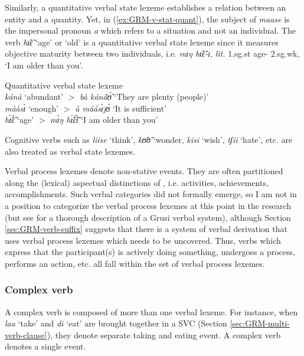 \begin{exe}
\begin{exe}
\begin{exe}
{\begin{exe}
\begin{exe}
\begin{exe}
\begin{exe}
\begin{exe}
\begin{exe}
\begin{exe}
\begin{xlist}
\begin{exe}
\begin{exe}
\begin{exe}
\begin{exe}
\begin{exe}
\begin{exe}
\begin{exe}
\begin{exe}
\begin{exe}
\begin{exe}
\begin{exe}
\begin{exe}
\begin{exe}
Similarly, a quantitative verbal state lexeme  establishes a relation between an
entity and a quantity. Yet, in (\ref{ex:GRM-v-stat-quant}), the subject of   
{\it maase} is the impersonal pronoun {\it a} which refers to a situation and 
not an
individual. The verb {\it hɪ̃ɛ̃}  `age' or `old'  is a quantitative verbal state
lexeme since it  measures  objective maturity between
two individuals, i.e. {\it mɪŋ hɪ̃ɛ̃-ɪ}, {\it lit.} {\sc 1.sg.st} age-{\sc
2.sg.wk}, `I am older than you'. 


\ea\label{ex:GRM-v-stat-quant}{\rm Quantitative verbal state lexeme}\\
 {\it kánà}  `abundant'  $>$ {\it bà kánã́ʊ̃́} `They are plenty (people)' 
\\
{\it mààsɪ̀} `enough'  $>$   {\it à máásɪ́jʊ́} `It is sufficient'\\
{\it hɪ̃̀ɛ̃̀} `age' $>$ {\it mɪ́ŋ hɪ̃́ɛ̃́ɪ̃̀} `I am older than you'
\z

Cognitive verbs such as {\it liise} `think',  {\it kʊ̃ʊ̃} `wonder, 
{\it kisi} `wish',    {\it tʃii} `hate', etc.  are also treated as verbal state
lexemes. 

Verbal process lexemes denote non-stative events. They are often partitioned
along the
(lexical) aspectual distinctions of  \citet{Vend57}, i.e. activities, 
achievements, accomplishments. Such verbal categories did not formally emerge, 
so I am not in a position to categorize the verbal process lexemes at this 
point 
in the research (but see \citealt[51]{Bonv88} for a thorough description of a 
Grusi verbal system), although Section \ref{sec:GRM-verb-suffix} suggests that 
there is a system of verbal derivation  that  uses verbal process lexemes which 
needs to be uncovered.  Thus, verbs which express that the participant(s) is 
actively doing something, undergoes a process, performs an action, etc. all 
fall 
within the  set of verbal process lexemes. 



\subsubsection{Complex verb}
\label{sec:GRM-complex-verb}

A complex verb is  composed of more than one verbal lexeme. For
instance, when {\it laa} `take' and {\it di}
`eat' are brought together in a SVC (Section \ref{sec:GRM-multi-verb-clause}),
they denote separate taking and eating event. A complex verb denotes a single 
event.


\end{exe}
\end{exe}
\end{exe}
\end{exe}
\end{exe}
\end{exe}
\end{exe}
\end{exe}
\end{exe}
\end{exe}
\end{exe}
\end{exe}
\end{exe}
\end{xlist}
\end{exe}
\end{exe}
\end{exe}
\end{exe}
\end{exe}
\end{exe}
\end{exe}}
\end{exe}
\end{exe}
\end{exe}
